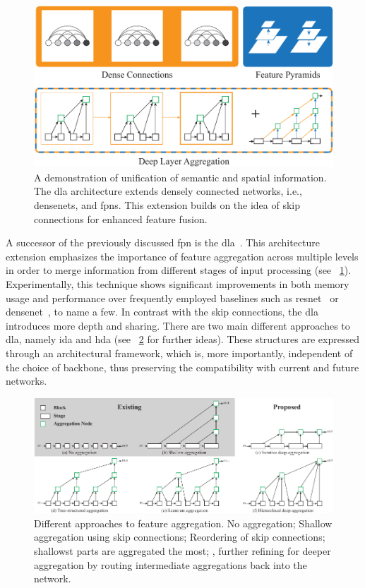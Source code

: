 \begin{figure}[t]
  \centerline{\includegraphics[width=0.7\linewidth]{figures/theoretical_foundations/dla_comparison.pdf}}
  \caption[\Gls{dla} comparison]{A demonstration of unification of semantic and spatial information. The \gls{dla} architecture extends densely connected networks, i.e., \glspl{densenet}, and \glspl{fpn}. This extension builds on the idea of skip connections for enhanced feature fusion. }
  \label{fig:DLAMotivation}
\end{figure}

A successor of the previously discussed \gls{fpn} is the \gls{dla}~\cite{yu2019dla}. This architecture extension emphasizes the importance of feature aggregation across multiple levels in order to merge information from different stages of input processing (see \figstr{}~\ref{fig:DLAMotivation}). Experimentally, this technique shows significant improvements in both memory usage and performance over frequently employed baselines such as \gls{resnet}~\cite{he2015resnet} or \gls{densenet}~\cite{huang2018densenet}, to name a few. In contrast with the skip connections, the \gls{dla} introduces more depth and sharing. There are two main different approaches to \gls{dla}, namely \gls{ida} and \gls{hda} (see \figstr{}~\ref{fig:DLADiffApproaches} for further ideas). These structures are expressed through an architectural framework, which is, more importantly, independent of the choice of backbone, thus preserving the compatibility with current and future networks.

\begin{figure}[t]
  \centerline{\includegraphics[width=0.8\linewidth]{figures/theoretical_foundations/dla_existing_vs_proposed.pdf}}
  \caption[\Gls{dla} proposed solution]{Different approaches to feature aggregation.  No aggregation;  Shallow aggregation using skip connections;  Reordering of skip connections;  shallowst parts are aggregated the most; ,  further refining for deeper aggregation by routing intermediate aggregations back into the network. }
  \label{fig:DLADiffApproaches}
\end{figure}

